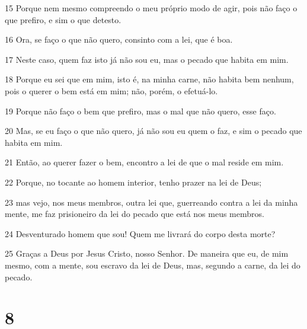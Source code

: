 \par 15 Porque nem mesmo compreendo o meu próprio modo de agir, pois não faço o que prefiro, e sim o que detesto.
\par 16 Ora, se faço o que não quero, consinto com a lei, que é boa.
\par 17 Neste caso, quem faz isto já não sou eu, mas o pecado que habita em mim.
\par 18 Porque eu sei que em mim, isto é, na minha carne, não habita bem nenhum, pois o querer o bem está em mim; não, porém, o efetuá-lo.
\par 19 Porque não faço o bem que prefiro, mas o mal que não quero, esse faço.
\par 20 Mas, se eu faço o que não quero, já não sou eu quem o faz, e sim o pecado que habita em mim.
\par 21 Então, ao querer fazer o bem, encontro a lei de que o mal reside em mim.
\par 22 Porque, no tocante ao homem interior, tenho prazer na lei de Deus;
\par 23 mas vejo, nos meus membros, outra lei que, guerreando contra a lei da minha mente, me faz prisioneiro da lei do pecado que está nos meus membros.
\par 24 Desventurado homem que sou! Quem me livrará do corpo desta morte?
\par 25 Graças a Deus por Jesus Cristo, nosso Senhor. De maneira que eu, de mim mesmo, com a mente, sou escravo da lei de Deus, mas, segundo a carne, da lei do pecado.

\chapter{8}

